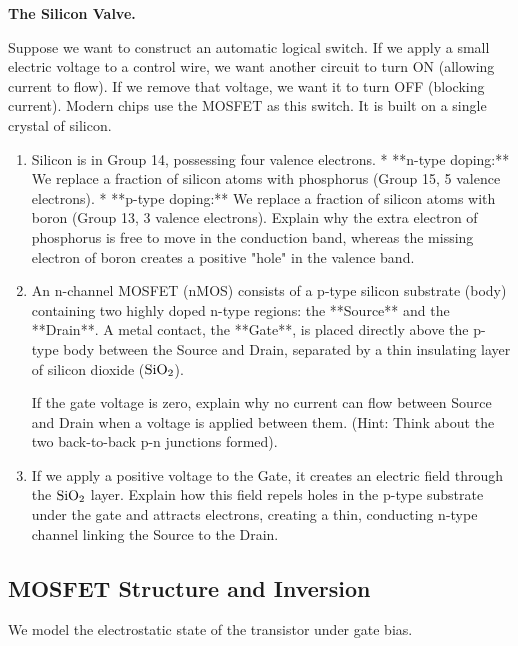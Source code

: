 \documentclass[12pt, a4paper]{book}
\begin{document}
\begin{puzzlebox}
\textbf{The Silicon Valve.}

Suppose we want to construct an automatic logical switch.
If we apply a small electric voltage to a control wire, we want another circuit to turn ON (allowing current to flow). If we remove that voltage, we want it to turn OFF (blocking current).
Modern chips use the MOSFET as this switch. It is built on a single crystal of silicon.
\begin{enumerate}[label=(\alph*), leftmargin=*]
  \item Silicon is in Group 14, possessing four valence electrons.
        * **n-type doping:** We replace a fraction of silicon atoms with phosphorus (Group 15, 5 valence electrons).
        * **p-type doping:** We replace a fraction of silicon atoms with boron (Group 13, 3 valence electrons).
        Explain why the extra electron of phosphorus is free to move in the conduction band, whereas the missing electron of boron creates a positive "hole" in the valence band.
  \item An n-channel MOSFET (nMOS) consists of a p-type silicon substrate (body) containing two highly doped n-type regions: the **Source** and the **Drain**.
        A metal contact, the **Gate**, is placed directly above the p-type body between the Source and Drain, separated by a thin insulating layer of silicon dioxide ($\ce{SiO2}$).
        
        If the gate voltage is zero, explain why no current can flow between Source and Drain when a voltage is applied between them. (Hint: Think about the two back-to-back p-n junctions formed).
  \item If we apply a positive voltage to the Gate, it creates an electric field through the $\ce{SiO2}$ layer.
        Explain how this field repels holes in the p-type substrate under the gate and attracts electrons, creating a thin, conducting n-type channel linking the Source to the Drain.
\end{enumerate}
\end{puzzlebox}

\subsection{MOSFET Structure and Inversion}

We model the electrostatic state of the transistor under gate bias.
\end{document}
